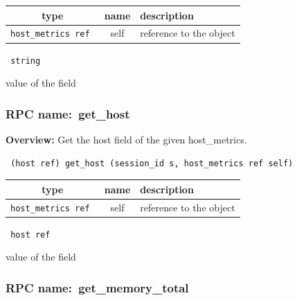 
 
\vspace{0.3cm}
\begin{tabular}{|c|c|p{7cm}|}
 \hline
{\bf type} & {\bf name} & {\bf description} \\ \hline
{\tt host\_metrics ref } & self & reference to the object \\ \hline 

\end{tabular}

\vspace{0.3cm}

{\tt 
string
}


value of the field
\vspace{0.3cm}
\vspace{0.3cm}
\vspace{0.3cm}
\subsubsection{RPC name:~get\_host}

{\bf Overview:} 
Get the host field of the given host\_metrics.

\begin{verbatim} (host ref) get_host (session_id s, host_metrics ref self)\end{verbatim}



 
\vspace{0.3cm}
\begin{tabular}{|c|c|p{7cm}|}
 \hline
{\bf type} & {\bf name} & {\bf description} \\ \hline
{\tt host\_metrics ref } & self & reference to the object \\ \hline 

\end{tabular}

\vspace{0.3cm}

{\tt 
host ref
}


value of the field
\vspace{0.3cm}
\vspace{0.3cm}
\vspace{0.3cm}
\subsubsection{RPC name:~get\_memory\_total}

